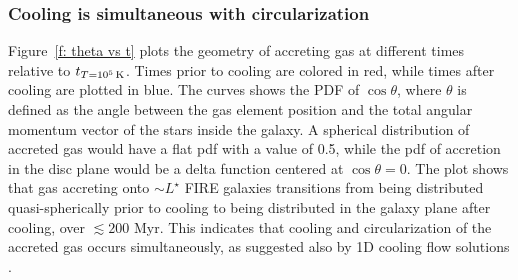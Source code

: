 \documentclass[fleqn,usenatbib]{mnras}
\newcommand{\tcon}{t_{T=10^5\,{\rm K}}}
\begin{document}
\subsubsection{Cooling is simultaneous with circularization}
\label{s: characteristics -- aligns}

Figure~\ref{f: theta vs t} plots the geometry of accreting gas at different times relative to $\tcon$.
Times prior to cooling are colored in red, while times after cooling are plotted in blue.
The curves shows the PDF of $\cos \theta$, where $\theta$ is defined as the angle between the gas element position and the total angular momentum vector of the stars inside the galaxy.
A spherical distribution of accreted gas would have a flat pdf with a value of 0.5, while 
the pdf of accretion in the disc plane would be a delta function centered at $\cos\theta = 0$.
The plot shows that gas accreting onto $\sim L^\star$ FIRE galaxies transitions from being distributed quasi-spherically prior to cooling to being distributed in the galaxy plane after cooling, over $\lesssim 200$ Myr.
This indicates that cooling and circularization of the accreted gas occurs simultaneously, as suggested also by 1D cooling flow solutions \citep{Stern2020}. 



\end{document}
